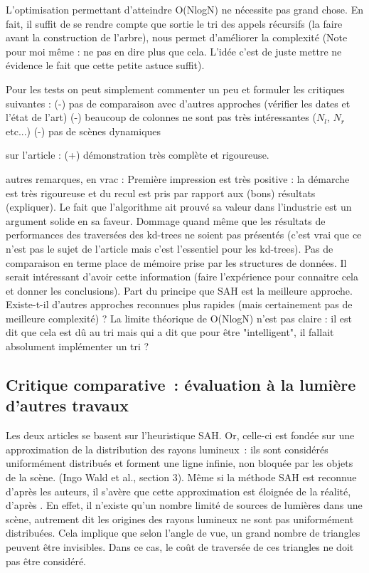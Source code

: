 \documentclass[a4paper]{article}
\begin{document}
L'optimisation permettant d'atteindre O(NlogN) ne nécessite pas grand chose. En fait, il suffit de se rendre compte que sortie le tri des appels récursifs (la faire avant la construction de l'arbre), nous permet d'améliorer la complexité (Note pour moi même : ne pas en dire plus que cela. L'idée c'est de juste mettre ne évidence le fait que cette petite astuce suffit).

Pour les tests on peut simplement commenter un peu et formuler les critiques suivantes :
(-) pas de comparaison avec d'autres approches (vérifier les dates et l'état de l'art)
(-) beaucoup de colonnes ne sont pas très intéressantes ($N_l$, $N_r$ etc...)
(-) pas de scènes dynamiques

sur l'article :
(+) démonstration très complète et rigoureuse.

autres remarques, en vrac :
Première impression est très positive : la démarche est très rigoureuse et du recul est pris par rapport aux (bons) résultats (expliquer). Le fait que l'algorithme ait prouvé sa valeur dans l'industrie est un argument solide en sa faveur. Dommage quand même que les résultats de performances des traversées des kd-trees ne soient pas présentés (c'est vrai que ce n'est pas le sujet de l'article mais c'est l'essentiel pour les kd-trees).
	Pas de comparaison en terme place de mémoire prise par les structures de données. Il serait intéressant d'avoir cette information (faire l'expérience pour connaitre cela et donner les conclusions).
	Part du principe que SAH est la meilleure approche. Existe-t-il d'autres approches reconnues plus rapides (mais certainement pas de meilleure complexité) ?
	La limite théorique de O(NlogN) n'est pas claire : il est dit que cela est dû au tri mais qui a dit que pour être "intelligent", il fallait absolument implémenter un tri ?
	

\subsection{Critique comparative~: évaluation à la lumière d'autres travaux}

Les deux articles se basent sur l'heuristique SAH. Or, celle-ci est fondée sur une approximation de la distribution des rayons lumineux~: ils sont considérés uniformément distribués et forment une ligne infinie, non bloquée par les objets de la scène. (Ingo Wald et al., section 3). Même si la méthode SAH est reconnue d'après les auteurs, il s'avère que cette approximation est éloignée de la réalité, d'après \cite{anti-sah}. En effet, il n'existe qu'un nombre limité de sources de lumières dans une scène, autrement dit les origines des rayons lumineux ne sont pas uniformément distribuées. Cela implique que selon l'angle de vue, un grand nombre de triangles peuvent être invisibles. Dans ce cas, le coût de traversée de ces triangles ne doit pas être considéré.
\end{document}
